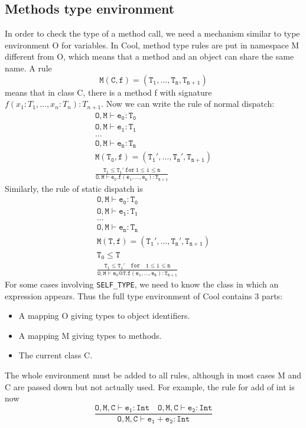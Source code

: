 \subsection{Methods type environment}
In order to check the type of a method call, we need a mechanism similar to type environment O for variables. In Cool, method type rules are put in namespace M different from O, which means that a method and an object can share the same name. A rule 
\begin{equation*}
\mathtt{M(C,f) = (T_1,\dots,T_n,T_{n+1})}
\end{equation*}
means that in class C, there is a method f with signature $f(x_1:T_1,\dots,x_n:T_n):T_{n+1}$. Now we can write the rule of normal dispatch:
\begin{gather*}
\mathtt{O,M\vdash e_0:T_0}\\
\mathtt{O,M\vdash e_1:T_1}\\
\dots\\
\mathtt{O,M\vdash e_n:T_n}\\
\mathtt{M(T_0,f) = (T_1',\dots,T_n', T_{n+1})}\\
\mathtt{\frac{T_i\leq T_i'\:for\:1\leq i \leq n}{O,M\vdash e_0.f(e_1,\dots,e_n):T_{n+1}}}
\end{gather*}
Similarly, the rule of static dispatch is 
\begin{gather*}
\mathtt{O,M\vdash e_0:T_0}\\
\mathtt{O,M\vdash e_1:T_1}\\
\dots\\
\mathtt{O,M\vdash e_n:T_n}\\
\mathtt{M(T,f) = (T_1',\dots,T_n',T_{n+1})}\\
\mathtt{T_0\leq T}\\
\mathtt{\frac{T_i\leq T_i'\quad for\quad1\leq i \leq n}{O,M\vdash e_0@T.f(e_1,\dots,e_n): T_{n+1}}}
\end{gather*}
For some cases involving \texttt{SELF\_TYPE}, we need to know the class in which an expression appears. Thus the full type environment of Cool contains 3 parts:
\begin{itemize}
\item A mapping O giving types to object identifiers.
\item A mapping M giving types to methods.
\item The current class C.
\end{itemize}
The whole environment must be added to all rules, although in most cases M and C are passed down but not actually used. For example, the rule for add of int is now
\begin{equation}\label{intaddrule}
\mathtt{\frac{O,M,C\vdash e_1:Int\quad O,M,C\vdash e_2:Int}{O,M,C\vdash e_1+e_2:Int}}
\end{equation}
